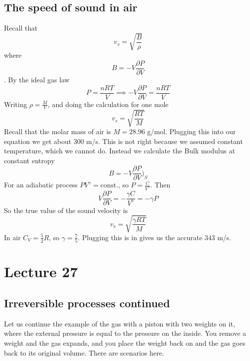 \documentclass{report}
\numberwithin{equation}{section}
\newcommand{\pd}[2]{\frac{\partial #1}{\partial #2}}
\begin{document}
\subsection{The speed of sound in air}
Recall that 
$$v_s = \sqrt{\frac{B}{\rho}}$$
where 
$$B = -V\pd{P}{V}$$. By the ideal gas law
\begin{equation*}
    P = \frac{nRT}{V} \implies -V\pd{P}{V}=\frac{nRT}{V}
\end{equation*}
Writing $\rho = \frac{M}{V}$, and doing the calculation for one mole
$$ v_s = \sqrt{\frac{RT}{M}}$$
Recall that the molar mass of air is $M = 28.96$ g/mol. Plugging this into our equation we get about 300 m/s. This is not right because we assumed constant 
temperature, which we cannot do. Instead we calculate the Bulk modulus at constant entropy 
$$ B = -V\pd{P}{V}\bigg)_S$$
For an adiabatic process $PV^{\gamma} = \text{const.}$, so $P = \frac{C}{V^{\gamma}}$. Then 
$$ V\pd{P}{V} = -\frac{\gamma C}{V^{\gamma}} = -\gamma P$$ 
So the true value of the sound velocity is 
\begin{equation}
    v_s = \sqrt{\frac{\gamma RT}{M}}
\end{equation}
In air $C_V = \frac{5}{2}R$, so $\gamma = \frac{7}{5}$. Plugging this is in gives us the accurate $343$ m/s. 
\section{Lecture 27}
\subsection{Irreversible processes continued}
Let us continue the example of the gas with a piston with two weights on it, where the external pressure is equal to the pressure on the inside. You remove a weight and the gas 
expands, and you place the weight back on and the gas goes back to its original volume. There are scenarios here.
\end{document}
